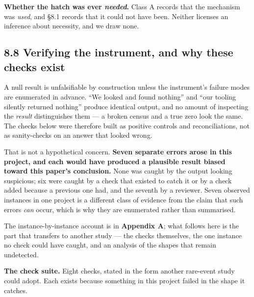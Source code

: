 \documentclass[conference]{IEEEtran}
\renewcommand{\_}{\textunderscore\allowbreak}
\begin{document}
\textbf{Whether the hatch was ever \emph{needed}.} Class A records that
the mechanism was \emph{used}, and §8.1 records that it could not have
been. Neither licenses an inference about necessity, and we draw none.

\subsection{8.8 Verifying the instrument, and why these checks
exist}\label{verifying-the-instrument-and-why-these-checks-exist}

A null result is unfalsifiable by construction unless the instrument's
failure modes are enumerated in advance. ``We looked and found nothing''
and ``our tooling silently returned nothing'' produce identical output,
and no amount of inspecting the \emph{result} distinguishes them --- a
broken census and a true zero look the same. The checks below were
therefore built as positive controls and reconciliations, not as
sanity-checks on an answer that looked wrong.

That is not a hypothetical concern. \textbf{Seven separate errors arose
in this project, and each would have produced a plausible result biased
toward this paper's conclusion.} None was caught by the output looking
suspicious; six were caught by a check that existed to catch it or by a
check added because a previous one had, and the seventh by a reviewer.
Seven observed instances in one project is a different class of evidence
from the claim that such errors \emph{can} occur, which is why they are
enumerated rather than summarised.

The instance-by-instance account is in \textbf{Appendix A}; what follows
here is the part that transfers to another study --- the checks
themselves, the one instance no check could have caught, and an analysis
of the shapes that remain undetected.

\textbf{The check suite.} Eight checks, stated in the form another
rare-event study could adopt. Each exists because something in this
project failed in the shape it catches.
\end{document}
